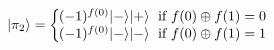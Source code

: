 \documentclass[preview]{standalone}
\begin{document}
\begin{align*}
|\pi_2\rangle = \left\{ \begin{array}{ll} \hspace{-2mm} (-1)^{f(0)} |-\rangle |+\rangle \; \text{ if } f(0) \oplus f(1) = 0 \\ \hspace{-2mm} (-1)^{f(0)} |-\rangle|-\rangle \; \text{ if } f(0) \oplus f(1) = 1 \end{array} \right.
\end{align*}
\end{document}
